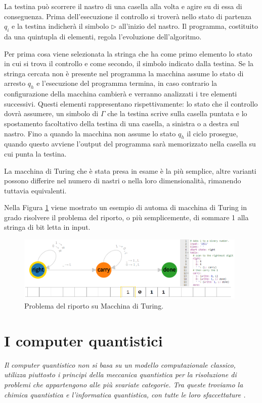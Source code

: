 La testina può scorrere il nastro di una casella alla volta e agire su di essa di conseguenza.
Prima dell'esecuzione il controllo si troverà nello stato di partenza $q_i$ e la testina indicherà il simbolo $\rhd$ all'inizio del nastro.
Il programma, costituito da una quintupla di elementi, regola l'evoluzione dell'algoritmo.

Per prima cosa viene selezionata la stringa che ha come primo elemento lo stato in cui si trova il controllo e come secondo, il simbolo indicato dalla testina.
Se la stringa cercata non è presente nel programma la macchina assume lo stato di arresto $q_h$ e l'esecuzione del programma termina, in caso contrario la configurazione della macchina cambierà e verranno analizzati i tre elementi successivi.
Questi elementi rappresentano rispettivamente: lo stato che il controllo dovrà assumere, un simbolo di $\Gamma$ che la testina scrive sulla casella puntata e lo spostamento facoltativo della testina di una casella, a sinistra o a destra sul nastro.
Fino a quando la macchina non assume lo stato $q_h$ il ciclo prosegue, quando questo avviene l'output del programma sarà memorizzato nella casella su cui punta la testina.

La macchina di Turing che è stata presa in esame è la più semplice, altre varianti possono differire nel numero di nastri o nella loro dimensionalità, rimanendo tuttavia equivalenti.

Nella Figura \ref{fig:esempio_turing} viene mostrato un esempio di automa di macchina di Turing in grado risolvere il problema del riporto, o più semplicemente, di sommare 1 alla stringa di bit letta in input.
\newline
\begin{figure}[htp]
    \centering
    \includegraphics[width=11cm]{Images/Capitolo1/esempio_turing.png}
    \caption{Problema del riporto su Macchina di Turing.}
    \label{fig:esempio_turing}
\end{figure}

\section{I computer quantistici}
\textit{Il computer quantistico non si basa su un modello computazionale classico, utilizza piuttosto i principi della meccanica quantistica per la risoluzione di problemi che appartengono alle più svariate categorie. Tra queste troviamo la chimica quantistica e l'informatica quantistica, con tutte le loro sfaccettature \cite{hofmann2003articolo}.} 

